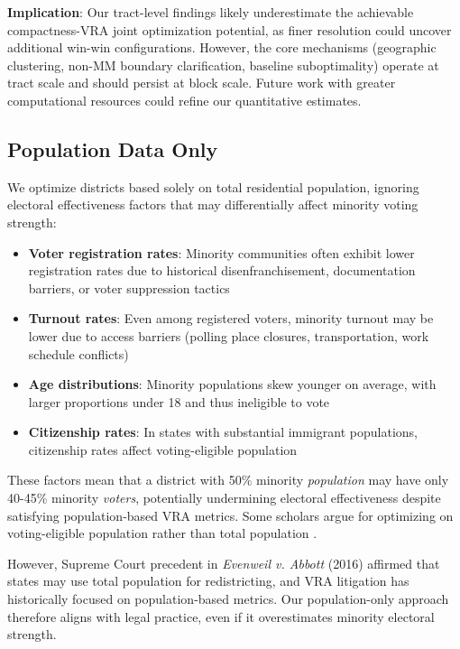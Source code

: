 \textbf{Implication}: Our tract-level findings likely underestimate the achievable compactness-VRA joint optimization potential, as finer resolution could uncover additional win-win configurations. However, the core mechanisms (geographic clustering, non-MM boundary clarification, baseline suboptimality) operate at tract scale and should persist at block scale. Future work with greater computational resources could refine our quantitative estimates.

\subsection{Population Data Only}

We optimize districts based solely on total residential population, ignoring electoral effectiveness factors that may differentially affect minority voting strength:
\begin{itemize}
    \item \textbf{Voter registration rates}: Minority communities often exhibit lower registration rates due to historical disenfranchisement, documentation barriers, or voter suppression tactics
    \item \textbf{Turnout rates}: Even among registered voters, minority turnout may be lower due to access barriers (polling place closures, transportation, work schedule conflicts)
    \item \textbf{Age distributions}: Minority populations skew younger on average, with larger proportions under 18 and thus ineligible to vote
    \item \textbf{Citizenship rates}: In states with substantial immigrant populations, citizenship rates affect voting-eligible population
\end{itemize}

These factors mean that a district with 50\% minority \emph{population} may have only 40-45\% minority \emph{voters}, potentially undermining electoral effectiveness despite satisfying population-based VRA metrics. Some scholars argue for optimizing on voting-eligible population rather than total population \citep{tucker2020}.

However, Supreme Court precedent in \emph{Evenweil v. Abbott} (2016) affirmed that states may use total population for redistricting, and VRA litigation has historically focused on population-based metrics. Our population-only approach therefore aligns with legal practice, even if it overestimates minority electoral strength.

